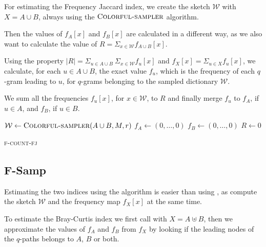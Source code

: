 For estimating the Frequency Jaccard index, we create the sketch $\mathcal{W}$ with $X = A \cup B$, always using the $\textsc{Colorful-sampler}$ algorithm. 

Then the values of $f_{A}[x]$ and $f_{B}[x]$ are calculated in a different way, as we also want to calculate the value of $R = \Sigma_{x \in \mathcal{W}} f_{A \cup B}[x]$.

Using the property $|R|= \Sigma_{u \in A \cup B}\ \Sigma_{x \in \mathcal{W}} f_{u}[x] $ and $f_{X}[x] = \Sigma_{u \in X}{ f_{u}[x] }$, we calculate, for each $u \in A \cup B$, the exact value $f_{u}$, which is the frequency of each $q$-gram leading to $u$, for $q$-grams belonging to the sampled dictionary $\mathcal{W}$.

We sum all the frequencies $f_u[x]$, for $x \in \mathcal{W}$, to $R$ and finally merge $f_{u}$ to $f_A$, if $u \in A$, and $f_B$, if $u \in B$.

\begin{algorithm}[h]
	\small
	\DontPrintSemicolon
	\BlankLine
	$\mathcal{W} \gets \textsc{Colorful-sampler}(A \cup B, M, r)$ \;
	$f_A \gets (0,\ldots,0)$\;
	$f_B \gets (0,\ldots,0)$\;
	$R \gets 0$\;
	\BlankLine
	\BlankLine
	\caption{\textsc{f-count-fj}}
	\label{alg:f-count-fj}
\end{algorithm}

\subsection*{F-Samp}

Estimating the two indices using the \fsamp algorithm is easier than using \fcount, as \fsamp compute the sketch $\mathcal{W}$ and the frequency map $f_X[x]$ at the same time.\medskip

To estimate the Bray-Curtis index we first call \fsamp with $X = A \uplus B$, then we approximate the values of $f_A$ and $f_B$ from $f_X$ by looking if the leading nodes of the $q$-paths belongs to $A$, $B$ or both.

